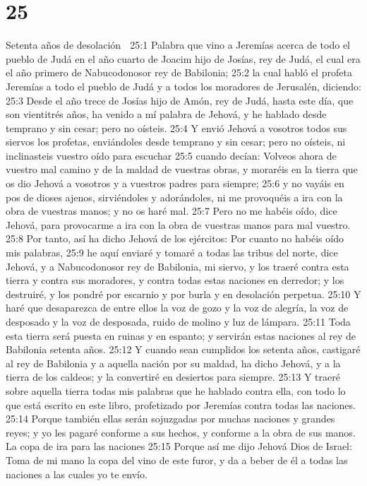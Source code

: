 \chapter{25}

Setenta años de desolación  

25:1 Palabra que vino a Jeremías acerca de todo el pueblo de Judá en el año cuarto de Joacim hijo de Josías, rey de Judá, el cual era el año primero de Nabucodonosor rey de Babilonia;  
25:2 la cual habló el profeta Jeremías a todo el pueblo de Judá y a todos los moradores de Jerusalén, diciendo:  
25:3 Desde el año trece de Josías hijo de Amón, rey de Judá, hasta este día, que son vientitrés años, ha venido a mí palabra de Jehová, y he hablado desde temprano y sin cesar; pero no oísteis.  
25:4 Y envió Jehová a vosotros todos sus siervos los profetas, enviándoles desde temprano y sin cesar; pero no oísteis, ni inclinasteis vuestro oído para escuchar  
25:5 cuando decían: Volveos ahora de vuestro mal camino y de la maldad de vuestras obras, y moraréis en la tierra que os dio Jehová a vosotros y a vuestros padres para siempre;  
25:6 y no vayáis en pos de dioses ajenos, sirviéndoles y adorándoles, ni me provoquéis a ira con la obra de vuestras manos; y no os haré mal.  
25:7 Pero no me habéis oído, dice Jehová, para provocarme a ira con la obra de vuestras manos para mal vuestro.  
25:8 Por tanto, así ha dicho Jehová de los ejércitos: Por cuanto no habéis oído mis palabras,  
25:9 he aquí enviaré y tomaré a todas las tribus del norte, dice Jehová, y a Nabucodonosor rey de Babilonia, mi siervo, y los traeré contra esta tierra y contra sus moradores, y contra todas estas naciones en derredor; y los destruiré, y los pondré por escarnio y por burla y en desolación perpetua.  
25:10 Y haré que desaparezca de entre ellos la voz de gozo y la voz de alegría, la voz de desposado y la voz de desposada, ruido de molino y luz de lámpara. 
25:11 Toda esta tierra será puesta en ruinas y en espanto; y servirán estas naciones al rey de Babilonia setenta años. 
25:12 Y cuando sean cumplidos los setenta años, castigaré al rey de Babilonia y a aquella nación por su maldad, ha dicho Jehová, y a la tierra de los caldeos; y la convertiré en desiertos para siempre.  
25:13 Y traeré sobre aquella tierra todas mis palabras que he hablado contra ella, con todo lo que está escrito en este libro, profetizado por Jeremías contra todas las naciones.  
25:14 Porque también ellas serán sojuzgadas por muchas naciones y grandes reyes; y yo les pagaré conforme a sus hechos, y conforme a la obra de sus manos.  
La copa de ira para las naciones  
25:15 Porque así me dijo Jehová Dios de Israel: Toma de mi mano la copa del vino de este furor, y da a beber de él a todas las naciones a las cuales yo te envío.  
